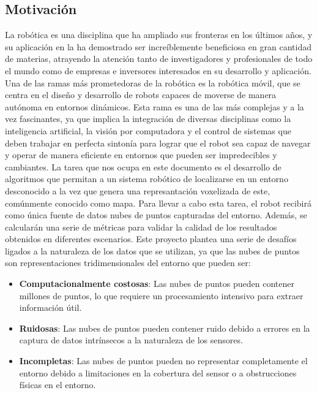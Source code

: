 \documentclass[12pt, a4paper, twoside]{article}
\begin{document}
\subsection{Motivación}
La robótica es una disciplina que ha ampliado sus fronteras en los últimos años, y su aplicación en la ha demostrado ser 
increíblemente beneficiosa en gran cantidad de materias, atrayendo la atención tanto de investigadores y profesionales de todo el 
mundo como de empresas e inversores interesados en su desarrollo y aplicación. \newline
Una de las ramas más prometedoras de la robótica es la robótica móvil, que se centra en el diseño y desarrollo de robots capaces 
de moverse de manera autónoma en entornos dinámicos. Esta rama es una de las más complejas y a la vez fascinantes, ya que implica 
la integración de diversas disciplinas como la inteligencia artificial, la visión por computadora y el control de sistemas que 
deben trabajar en perfecta sintonía para lograr que el robot sea capaz de navegar y operar de manera eficiente en entornos que 
pueden ser impredecibles y cambiantes. \newline
La tarea que nos ocupa en este documento es el desarrollo de algoritmos que permitan a un sistema robótico de localizarse en un entorno 
desconocido a la vez que genera una represantación voxelizada de este, comúnmente conocido como mapa. Para llevar a cabo esta tarea, 
el robot recibirá como única fuente de datos nubes de puntos capturadas del entorno. Además, se calcularán una serie de métricas para 
validar la calidad de los resultados obtenidos en diferentes escenarios.\newline
Este proyecto plantea una serie de desafíos ligados a la naturaleza de los datos que se utilizan, ya que las nubes de puntos son 
representaciones tridimensionales del entorno que pueden ser:  
\begin{itemize}
  \item  \textbf{Computacionalmente costosas}: 
    Las nubes de puntos pueden contener millones de puntos, lo que requiere un procesamiento intensivo para extraer información útil.
  \item  \textbf{Ruidosas}:
    Las nubes de puntos pueden contener ruido debido a errores en la captura de datos intrínsecos a la naturaleza de los sensores.
  \item  \textbf{Incompletas}:
    Las nubes de puntos pueden no representar completamente el entorno debido a limitaciones en la cobertura del sensor o a 
    obstrucciones físicas en el entorno.
\end{itemize}
\end{document}
